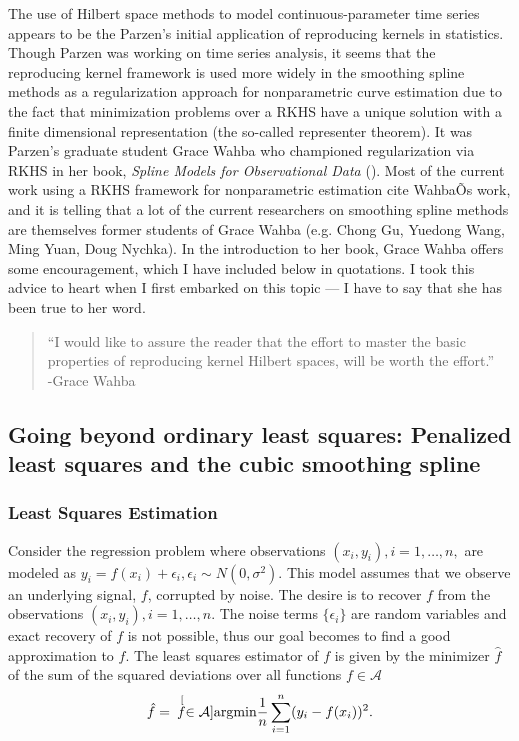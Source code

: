 The use of Hilbert space methods to model continuous-parameter time series appears to be the Parzen's initial application of reproducing kernels in statistics. Though Parzen was working on time series analysis, it seems that the reproducing kernel framework is used more widely in the smoothing spline methods as a regularization approach for nonparametric curve estimation due to the fact that minimization problems over a RKHS have a unique solution with a finite dimensional representation (the so-called representer theorem). It was Parzen's graduate student Grace Wahba who championed regularization via RKHS in her book, \emph{Spline Models for Observational Data} (\cite{Wahba:1990}). Most of the current work using a RKHS framework for nonparametric estimation cite WahbaÕs work, and it is telling that a lot of the current researchers on smoothing spline methods are themselves former students of Grace Wahba (e.g. Chong Gu, Yuedong Wang, Ming Yuan, Doug Nychka). In the introduction to her book, Grace Wahba offers some encouragement, which I have included below in quotations. I took this advice to heart when I first embarked on this topic --- I have to say that she has been true to her word. 
\begin{quote}
``I would like to assure the reader that the effort to master the basic properties of reproducing kernel Hilbert spaces, will be worth the effort.''\\
-Grace Wahba
\end{quote}

\subsection{ Going beyond ordinary least squares: Penalized least squares and the cubic smoothing spline} 


\subsubsection{Least Squares Estimation}
Consider the regression problem where observations $(x_i, y_i), i=1,\dots,n,$ are modeled as $y_i = f(x_i) + \epsilon_i, \epsilon_i \sim N(0,\sigma^2).$ This model assumes that we observe an underlying signal, $f$, corrupted by noise. The desire is to recover $f$ from the observations $(x_i, y_i), i=1,\dots,n$. The noise terms $\{\epsilon_i\}$ are random variables and exact recovery of $f$ is not possible, thus our goal becomes to find a good approximation to $f$. The least squares estimator of $f$ is given by the minimizer $\hat{f}$ of the sum of the squared deviations over all functions $f \in \mathcal{A}$ 
\begin{equation*}
\hat{f} = \hspace{.07in} \stackrel[f \in \mathcal{A}]{}{\mbox{argmin}} \frac{1}{n}\sum_{i=1}^{n}(y_i - f(x_i))^2.
\label{eq:LS}
\end{equation*}

